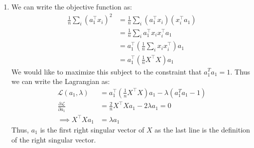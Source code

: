 \documentclass[a4paper]{article}
\theoremstyle{definition}
\begin{document}
\begin{enumerate}
    \item We can write the objective function as:
    \begin{align*}
        \frac{1}{n} \sum_i (a_1^\top x_i)^2 &= \frac{1}{n} \sum_i (a_1^\top x_i)(x_i^\top a_1)\\
        &= \frac{1}{n} \sum_i a_1^\top x_i x_i^\top a_1\\
        &= a_1^\top \left(\frac{1}{n} \sum_i x_i x_i^\top \right) a_1\\
        &= a_1^\top \left(\frac{1}{n} X^\top X \right) a_1
    \end{align*}
    We would like to maximize this subject to the constraint that $a_1^Ta_1 = 1$. Thus we can write the Lagrangian as:
    \begin{align*}
        \mathcal{L}(a_1, \lambda) &= a_1^\top \left(\frac{1}{n} X^\top X \right) a_1 - \lambda(a_1^Ta_1 - 1)\\
        \frac{\partial \mathcal{L}}{\partial a_1} &= \frac{2}{n} X^\top X a_1 - 2\lambda a_1 = 0\\
        \implies X^\top X a_1 &= \lambda a_1
    \end{align*}
    Thus, $a_1$ is the first right singular vector of $X$ as the last line is the definition of the right singular vector.


\end{enumerate}
\end{document}
